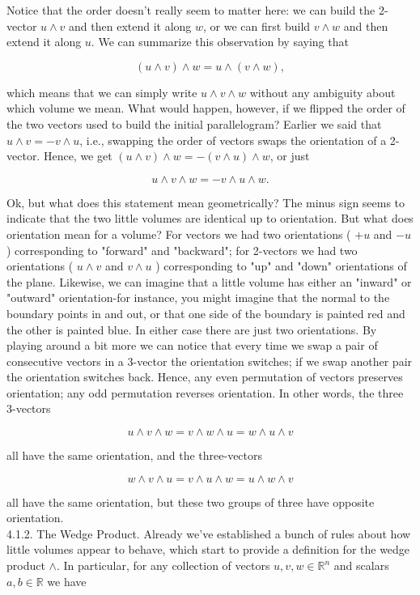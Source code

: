 \documentclass[10pt]{article}
\begin{document}
Notice that the order doesn't really seem to matter here: we can build the 2-vector $u \wedge v$ and then extend it along $w$, or we can first build $v \wedge w$ and then extend it along $u$. We can summarize this observation by saying that

$$
(u \wedge v) \wedge w=u \wedge(v \wedge w),
$$

which means that we can simply write $u \wedge v \wedge w$ without any ambiguity about which volume we mean. What would happen, however, if we flipped the order of the two vectors used to build the initial parallelogram? Earlier we said that $u \wedge v=-v \wedge u$, i.e., swapping the order of vectors swaps the orientation of a 2-vector. Hence, we get $(u \wedge v) \wedge w=-(v \wedge u) \wedge w$, or just

$$
u \wedge v \wedge w=-v \wedge u \wedge w .
$$

Ok, but what does this statement mean geometrically? The minus sign seems to indicate that the two little volumes are identical up to orientation. But what does orientation mean for a volume? For vectors we had two orientations ( $+u$ and $-u$ ) corresponding to "forward" and "backward"; for 2-vectors we had two orientations ( $u \wedge v$ and $v \wedge u$ ) corresponding to "up" and "down" orientations of the plane. Likewise, we can imagine that a little volume has either an "inward" or "outward" orientation-for instance, you might imagine that the normal to the boundary points in and out, or that one side of the boundary is painted red and the other is painted blue. In either case there are just two orientations. By playing around a bit more we can notice that every time we swap a pair of consecutive vectors in a 3-vector the orientation switches; if we swap another pair the orientation switches back. Hence, any even permutation of vectors preserves orientation; any odd permutation reverses orientation. In other words, the three 3-vectors

$$
u \wedge v \wedge w=v \wedge w \wedge u=w \wedge u \wedge v
$$

all have the same orientation, and the three-vectors

$$
w \wedge v \wedge u=v \wedge u \wedge w=u \wedge w \wedge v
$$

all have the same orientation, but these two groups of three have opposite orientation.\\
4.1.2. The Wedge Product. Already we've established a bunch of rules about how little volumes appear to behave, which start to provide a definition for the wedge product $\wedge$. In particular, for any collection of vectors $u, v, w \in \mathbb{R}^{n}$ and scalars $a, b \in \mathbb{R}$ we have
\end{document}
